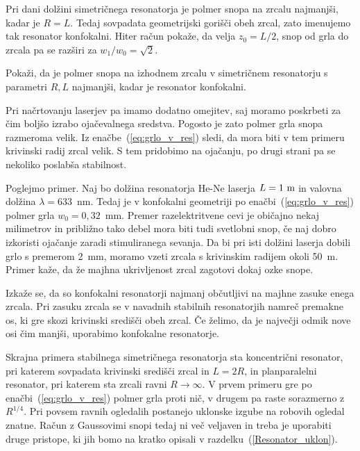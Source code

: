Pri dani dolžini simetričnega resonatorja je polmer snopa na zrcalu najmanjši,
kadar je $R=L$. Tedaj sovpadata geometrijski gorišči obeh zrcal,
zato imenujemo tak resonator konfokalni. 
Hiter račun pokaže, da velja $z_{0}=L/2$, snop od grla do zrcala pa se razširi
za $w_1/w_0=\sqrt{2}$. 
\begin{definition}
\label{naloga:uklon_konf}
 Pokaži, da je polmer snopa na izhodnem zrcalu v simetričnem resonatorju s parametri $R,L$
 najmanjši, kadar je resonator konfokalni.
\end{definition}

Pri načrtovanju laserjev pa imamo dodatno omejitev, saj moramo poskrbeti za 
čim boljšo izrabo ojačevalnega sredstva. Pogosto je zato 
polmer grla snopa razmeroma velik. Iz enačbe~(\ref{eq:grlo_v_res})
sledi, da mora biti v tem primeru krivinski radij zrcal velik. S tem
pridobimo na ojačanju, po drugi strani pa se nekoliko poslabša stabilnost.

Poglejmo primer. Naj bo dolžina resonatorja He-Ne laserja $L=1~\metre$ in valovna
dolžina $\lambda = 633$~nm. Tedaj je v konfokalni geometriji po enačbi~(\ref{eq:grlo_v_res})
polmer grla $w_{0}=0,32$~mm. Premer razelektritvene cevi je običajno
nekaj milimetrov in približno tako debel mora biti tudi svetlobni
snop, če naj dobro izkoristi ojačanje zaradi stimuliranega sevanja.
Da bi pri isti dolžini laserja dobili grlo s premerom 2~mm, moramo vzeti
zrcala s krivinskim radijem okoli 50~m. Primer kaže, da že majhna ukrivljenost 
zrcal zagotovi dokaj ozke snope.

\begin{remark}
Izkaže se, da so konfokalni resonatorji najmanj občutljivi na majhne zasuke enega zrcala. 
Pri zasuku zrcala se v navadnih stabilnih resonatorjih namreč premakne os, ki gre skozi 
krivinski središči obeh zrcal. Če želimo, da je največji odmik nove osi čim
manjši, uporabimo konfokalne resonatorje. 
\end{remark}

Skrajna primera stabilnega simetričnega resonatorja sta 
koncentrični resonator,
pri katerem sovpadata krivinski središči zrcal in $L=2R$, in planparalelni 
resonator, pri katerem sta zrcali ravni $R \to \infty$.
V prvem primeru gre po enačbi~(\ref{eq:grlo_v_res}) polmer grla proti nič, v drugem pa raste sorazmerno
z $R^{1/4}$. Pri povsem ravnih ogledalih postanejo uklonske
izgube na robovih ogledal znatne. Račun z Gaussovimi snopi tedaj ni več veljaven
in treba je uporabiti druge pristope, ki jih bomo na kratko opisali
v razdelku~(\ref{Resonator_uklon}).

